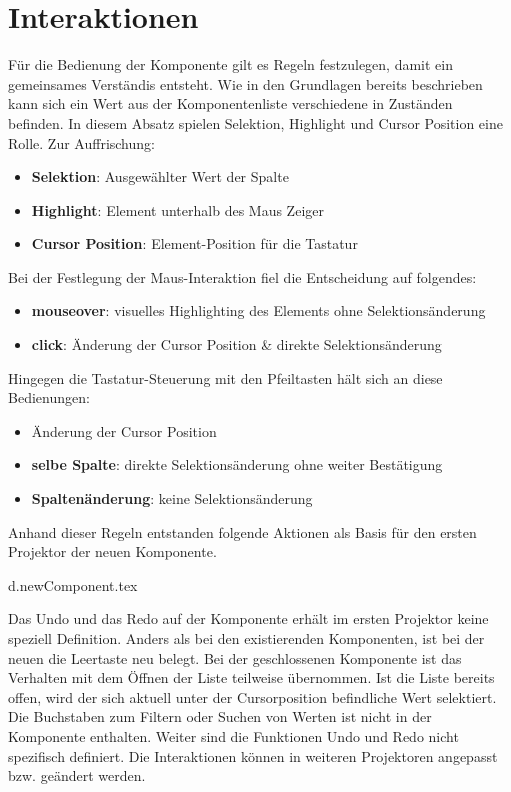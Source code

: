 \section{Interaktionen}

Für die Bedienung der Komponente gilt es Regeln festzulegen, damit ein gemeinsames Verständis entsteht.
Wie in den Grundlagen bereits beschrieben kann sich ein Wert aus der Komponentenliste verschiedene in Zuständen befinden.
In diesem Absatz spielen Selektion, Highlight und Cursor Position eine Rolle.
Zur Auffrischung: 

\begin{itemize}
    \item \textbf{Selektion}: Ausgewählter Wert der Spalte
    \item \textbf{Highlight}: Element unterhalb des Maus Zeiger
    \item \textbf{Cursor Position}: Element-Position für die Tastatur
\end{itemize}

\noindent
Bei der Festlegung der Maus-Interaktion fiel die Entscheidung auf folgendes:

\begin{itemize}
    \item \textbf{mouseover}: visuelles Highlighting des Elements ohne Selektionsänderung
    \item \textbf{click}: Änderung der Cursor Position \& direkte Selektionsänderung
\end{itemize}

\noindent
Hingegen die Tastatur-Steuerung mit den Pfeiltasten hält sich an diese Bedienungen:

\begin{itemize}
    \item Änderung der Cursor Position
    \item \textbf{selbe Spalte}: direkte Selektionsänderung ohne weiter Bestätigung
    \item \textbf{Spaltenänderung}: keine Selektionsänderung
\end{itemize}

\noindent
Anhand dieser Regeln entstanden folgende Aktionen als Basis für den ersten Projektor der neuen Komponente. 


\clearpage
{d.newComponent.tex}

Das Undo und das Redo auf der Komponente erhält im ersten Projektor keine speziell Definition.
Anders als bei den existierenden Komponenten, ist bei der neuen die Leertaste neu belegt. 
Bei der geschlossenen Komponente ist das Verhalten mit dem Öffnen der Liste teilweise übernommen.
Ist die Liste bereits offen, wird der sich aktuell unter der Cursorposition befindliche Wert selektiert.
Die Buchstaben zum Filtern oder Suchen von Werten ist nicht in der Komponente enthalten.
Weiter sind die Funktionen Undo und Redo nicht spezifisch definiert.
Die Interaktionen können in weiteren Projektoren angepasst bzw. geändert werden.



